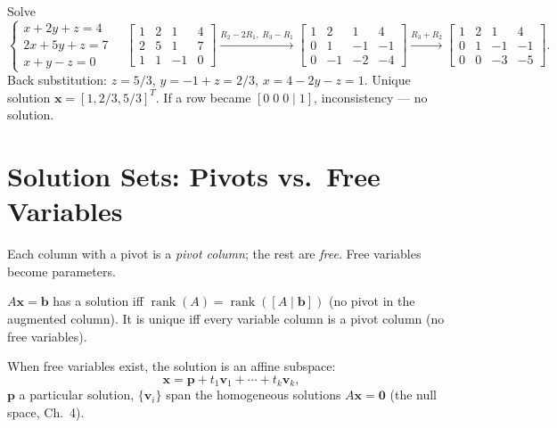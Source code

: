 \begin{example}
Solve
\[
\begin{cases}
  x+2y+z=4\\ 2x+5y+z=7\\ x+y- z=0
\end{cases}\quad
\left[\begin{array}{ccc|c}1&2&1&4\\2&5&1&7\\1&1&-1&0\end{array}\right]
\xrightarrow{R_2-2R_1,\;R_3-R_1}
\left[\begin{array}{ccc|c}1&2&1&4\\0&1&-1&-1\\0&-1&-2&-4\end{array}\right]
\xrightarrow{R_3+R_2}
\left[\begin{array}{ccc|c}1&2&1&4\\0&1&-1&-1\\0&0&-3&-5\end{array}\right].
\]
Back substitution: $z=5/3$, $y=-1+z=2/3$, $x=4-2y-z=1$. Unique solution $\mathbf{x}=[1,2/3,5/3]^T$. If a row became $[0\;0\;0\mid1]$, inconsistency --- no solution.
\end{example}

\section{Solution Sets: Pivots vs.\ Free Variables}
\label{sec:solution-sets}
Each column with a pivot is a \emph{pivot column}; the rest are \emph{free}. Free variables become parameters.

\begin{theorem}
$A\mathbf{x}=\mathbf{b}$ has a solution iff $\operatorname{rank}(A)=\operatorname{rank}([A\mid\mathbf{b}])$ (no pivot in the augmented column). It is unique iff every variable column is a pivot column (no free variables).
\end{theorem}

When free variables exist, the solution is an affine subspace:
\[
  \mathbf{x}=\mathbf{p}+t_1\mathbf{v}_1+\cdots+t_k\mathbf{v}_k,
\]
$\mathbf{p}$ a particular solution, $\{\mathbf{v}_i\}$ span the homogeneous solutions $A\mathbf{x}=\mathbf{0}$ (the null space, Ch.~4).

